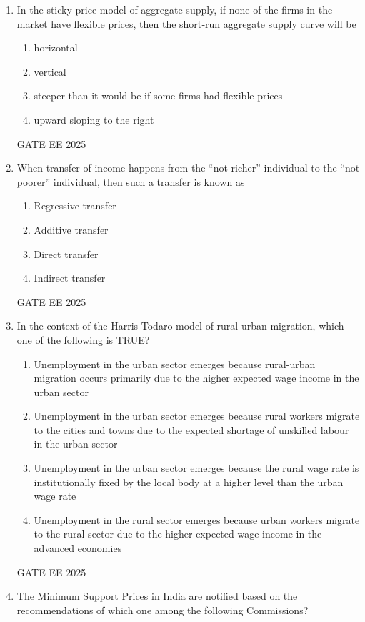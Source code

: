 \documentclass[journal,12pt,onecolumn]{IEEEtran}
\theoremstyle{remark}
\begin{document}
\begin{enumerate}
    \item In the sticky‐price model of aggregate supply, if none of the firms in the market have flexible prices, then the short‐run aggregate supply curve will be
    \begin{enumerate}[label=(\Alph*)]
        \item horizontal
        \item vertical
        \item steeper than it would be if some firms had flexible prices
        \item upward sloping to the right
    \end{enumerate}
    GATE EE 2025\\
\item When transfer of income happens from the ``not richer'' individual to the ``not poorer'' individual, then such a transfer is known as
    \begin{enumerate}[label=(\Alph*)]
    \item Regressive transfer
    \item Additive transfer
    \item Direct transfer
    \item Indirect transfer
    \end{enumerate}
GATE EE 2025\\
\item In the context of the Harris-Todaro model of rural-urban migration, which one of the following is TRUE?
    \begin{enumerate}[label=(\Alph*)]
    \item Unemployment in the urban sector emerges because rural-urban migration occurs primarily due to the higher expected wage income in the urban sector
    \item Unemployment in the urban sector emerges because rural workers migrate to the cities and towns due to the expected shortage of unskilled labour in the urban sector
    \item Unemployment in the urban sector emerges because the rural wage rate is institutionally fixed by the local body at a higher level than the urban wage rate
    \item Unemployment in the rural sector emerges because urban workers migrate to the rural sector due to the higher expected wage income in the advanced economies
    \end{enumerate}
GATE EE 2025\\
\item The Minimum Support Prices in India are notified based on the recommendations of which one among the following Commissions?

\end{enumerate}
\end{document}
